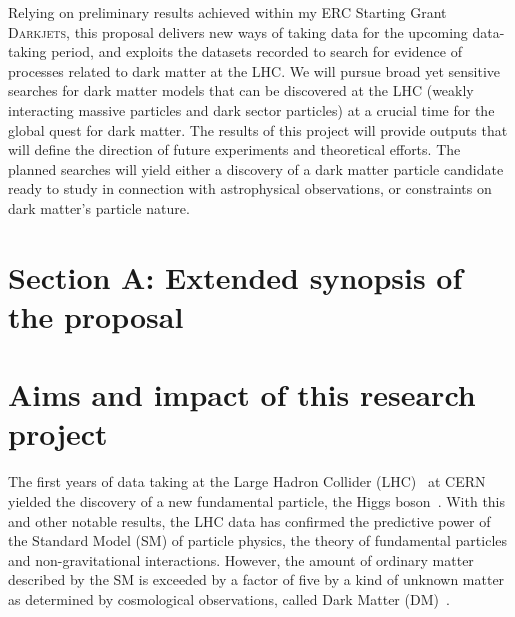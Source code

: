 \documentclass[11pt,a4paper]{article}
\begin{document}
Relying on preliminary results achieved within my ERC Starting Grant \textsc{Darkjets}, this proposal delivers new ways of taking data for the upcoming data-taking period, and exploits the datasets recorded to search for evidence of processes related to dark matter at the LHC. 
We will pursue broad yet sensitive searches for dark matter models that can be discovered at the LHC (weakly interacting massive particles and dark sector particles) at a crucial time for the global quest for dark matter. 
The results of this project will provide outputs that will define the direction of future experiments and theoretical efforts. 
The planned searches will yield either a discovery of a dark matter particle candidate ready to study in connection with astrophysical observations, or constraints on dark matter’s particle nature. 

\clearpage

\section*{Section A: Extended synopsis of the proposal} 

\medskip

\section{Aims and impact of this research project} 
\smallskip

The first years of data taking at the Large Hadron Collider (LHC)~\cite{LHC2008} at CERN yielded the discovery of a new fundamental particle, the Higgs boson~\cite{Khachatryan:2016vau}. With this and other notable results, the LHC data has confirmed the predictive power of the Standard Model (SM) of particle physics, the theory of fundamental particles and non-gravitational interactions. However, the amount of ordinary matter described by the SM is exceeded by a factor of five by a kind of unknown matter as determined by cosmological observations, called Dark Matter (DM)~\cite{Bertone:2016nfn}. 

\end{document}
